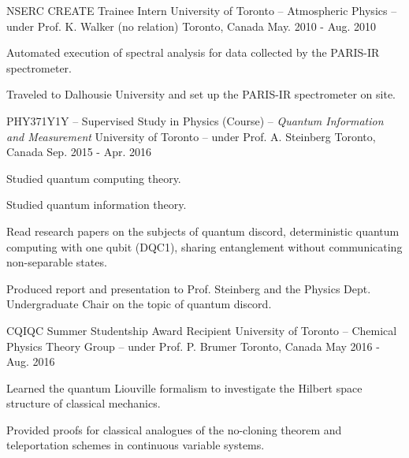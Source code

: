 

\begin{cventries}

  \cventry
    {NSERC CREATE Trainee Intern} %
    {University of Toronto -- Atmospheric Physics -- under Prof. K. Walker (no relation)} %
    {Toronto, Canada} %
    {May. 2010 - Aug. 2010} %
    {
      \begin{cvitems} %
        \item{Automated execution of spectral analysis for data collected by the
            PARIS-IR spectrometer.}
        \item{Traveled to Dalhousie University and set up the PARIS-IR
            spectrometer on site.}
      \end{cvitems}
    }

  \cventry
    {PHY371Y1Y -- Supervised Study in Physics (Course) -- \emph{Quantum
        Information and Measurement}} %
    {University of Toronto -- under Prof. A. Steinberg} %
    {Toronto, Canada} %
    {Sep. 2015 - Apr. 2016} %
    {
      \begin{cvitems} %
      \item{Studied quantum computing theory.}
      \item{Studied quantum information theory.}
      \item{Read research papers on the subjects of quantum discord,
          deterministic quantum computing with one qubit (DQC1), sharing
          entanglement without communicating non-separable states.}
      \item{Produced report and presentation to Prof. Steinberg and the Physics
          Dept. Undergraduate Chair on the topic of quantum discord.}
      \end{cvitems}
    }

  \cventry
    {CQIQC Summer Studentship Award Recipient} %
    {University of Toronto -- Chemical Physics Theory Group -- under Prof. P. Brumer} %
    {Toronto, Canada} %
    {May 2016 - Aug. 2016} %
    {
      \begin{cvitems} %
        \item{Learned the quantum Liouville formalism to investigate the Hilbert
            space structure of classical mechanics.}
        \item{Provided proofs for classical analogues of the no-cloning theorem
            and teleportation schemes in continuous variable systems.}
      \end{cvitems}
    }


\end{cventries}
